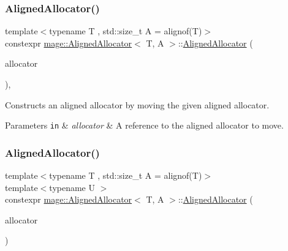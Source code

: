 \subsubsection{\texorpdfstring{Aligned\+Allocator()}{AlignedAllocator()}\hspace{0.1cm}{\footnotesize\ttfamily [3/4]}}
{\footnotesize\ttfamily template$<$typename T , std\+::size\+\_\+t A = alignof(\+T)$>$ \\
constexpr \mbox{\hyperlink{classmage_1_1_aligned_allocator}{mage\+::\+Aligned\+Allocator}}$<$ T, A $>$\+::\mbox{\hyperlink{classmage_1_1_aligned_allocator}{Aligned\+Allocator}} (\begin{DoxyParamCaption}\item[{\mbox{\hyperlink{classmage_1_1_aligned_allocator}{Aligned\+Allocator}}$<$ T, A $>$ \&\&}]{allocator }\end{DoxyParamCaption})\hspace{0.3cm}{\ttfamily [default]}, {\ttfamily [noexcept]}}

Constructs an aligned allocator by moving the given aligned allocator.


\begin{DoxyParams}[1]{Parameters}
\mbox{\tt in}  & {\em allocator} & A reference to the aligned allocator to move. \\
\hline
\end{DoxyParams}
\mbox{\label{classmage_1_1_aligned_allocator_a6f671f86583ecd883fa5c6ae22fd7fcb}} 
\subsubsection{\texorpdfstring{Aligned\+Allocator()}{AlignedAllocator()}\hspace{0.1cm}{\footnotesize\ttfamily [4/4]}}
{\footnotesize\ttfamily template$<$typename T , std\+::size\+\_\+t A = alignof(\+T)$>$ \\
template$<$typename U $>$ \\
constexpr \mbox{\hyperlink{classmage_1_1_aligned_allocator}{mage\+::\+Aligned\+Allocator}}$<$ T, A $>$\+::\mbox{\hyperlink{classmage_1_1_aligned_allocator}{Aligned\+Allocator}} (\begin{DoxyParamCaption}\item[{\mbox{[}\mbox{[}maybe\+\_\+unused\mbox{]} \mbox{]} const \mbox{\hyperlink{classmage_1_1_aligned_allocator}{Aligned\+Allocator}}$<$ U, A $>$ \&}]{allocator }\end{DoxyParamCaption})\hspace{0.3cm}{\ttfamily [noexcept]}}

